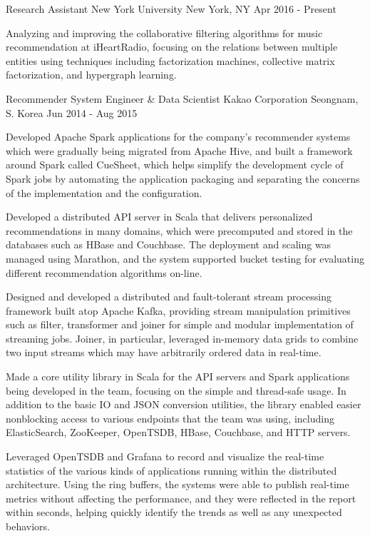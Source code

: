 \documentclass[12pt, a4paper]{awesome-cv}
\begin{document}
	\makecvheader
	
	\begin{cventries}
		\cventry
		{Research Assistant}
		{New York University}
		{New York, NY}
		{Apr 2016 - Present}
		{
			\begin{cvitems}
				\item Analyzing and improving the collaborative filtering algorithms for music recommendation at iHeartRadio, focusing on the relations between multiple entities using techniques including factorization machines, collective matrix factorization, and hypergraph learning.
			\end{cvitems}
		}
		\cventry
		{Recommender System Engineer \& Data Scientist}
		{Kakao Corporation}
		{Seongnam, S. Korea}
		{Jun 2014 - Aug 2015}
		{
			\begin{cvitems}
				\item Developed Apache Spark applications for the company's recommender systems which were gradually being migrated from Apache Hive, and built a framework around Spark called CueSheet, which helps simplify the development cycle of Spark jobs by automating the application packaging and separating the concerns of the implementation and the configuration.
				\item Developed a distributed API server in Scala that delivers personalized recommendations in many domains, which were precomputed and stored in the databases such as HBase and Couchbase. The deployment and scaling was managed using Marathon, and the system supported bucket testing for evaluating different recommendation algorithms on-line.
				\item Designed and developed a distributed and fault-tolerant stream processing framework built atop Apache Kafka, providing stream manipulation primitives such as filter, transformer and joiner for simple and modular implementation of streaming jobs. Joiner, in particular, leveraged in-memory data grids to combine two input streams which may have arbitrarily ordered data  in real-time.
				\item Made a core utility library in Scala for the API servers and Spark applications being developed in the team, focusing on the simple and thread-safe usage. In addition to the basic IO and JSON conversion utilities, the library enabled easier nonblocking access to various endpoints that the team was using, including ElasticSearch, ZooKeeper, OpenTSDB, HBase, Couchbase, and HTTP servers.
				\item Leveraged OpenTSDB and Grafana to record and visualize the real-time statistics of the various kinds of applications running within the distributed architecture. Using the ring buffers, the systems were able to publish real-time metrics without affecting the performance, and they were reflected in the report within seconds, helping quickly identify the trends as well as any unexpected behaviors.

\end{cvitems}}
\end{cventries}
\end{document}
